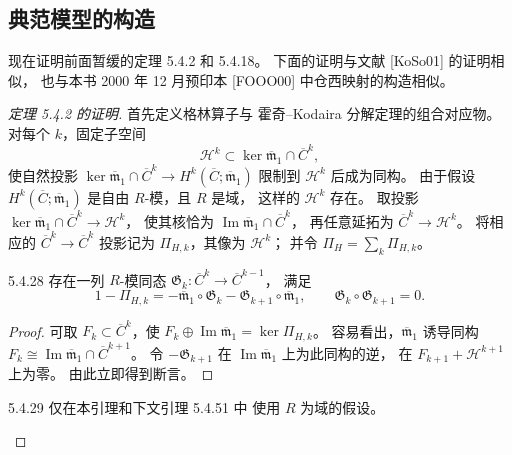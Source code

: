 
\subsection{典范模型的构造}
\label{subsec:5-4-4}

现在证明前面暂缓的定理 5.4.2 和 5.4.18。
下面的证明与文献 [KoSo01] 的证明相似，
也与本书 2000 年 12 月预印本 [FOOO00]
中仓西映射的构造相似。

\begin{proof}[定理 5.4.2 的证明]
首先定义格林算子与
霍奇–Kodaira 分解定理的组合对应物。
对每个 $k$，固定子空间
\[
\mathcal H^k\subset
\ker\overline{\mathfrak m}_1\cap\overline C^k,
\]
使自然投影
$\ker\overline{\mathfrak m}_1\cap\overline C^k
\to H^k(\overline C;\overline{\mathfrak m}_1)$
限制到 $\mathcal H^k$ 后成为同构。
由于假设
$H^k(\overline C;\overline{\mathfrak m}_1)$
是自由 $R$-模，且 $R$ 是域，
这样的 $\mathcal H^k$ 存在。
取投影
$\ker\overline{\mathfrak m}_1\cap\overline C^k
\to\mathcal H^k$，
使其核恰为
$\operatorname{Im}\overline{\mathfrak m}_1
\cap\overline C^k$，
再任意延拓为
$\overline C^k\to\mathcal H^k$。
将相应的
$\overline C^k\to\overline C^k$ 投影记为
$\Pi_{H,k}$，其像为 $\mathcal H^k$；
并令 $\Pi_H=\sum_k\Pi_{H,k}$。

\begin{lemma}{5.4.28}\label{lem:5-4-28}
存在一列 $R$-模同态
$\mathfrak G_k\colon
\overline C^k\to\overline C^{k-1}$，
满足
\[
1-\Pi_{H,k}
=-\overline{\mathfrak m}_1\circ\mathfrak G_k
-\mathfrak G_{k+1}\circ\overline{\mathfrak m}_1,
\qquad
\mathfrak G_k\circ\mathfrak G_{k+1}=0.
\]
\end{lemma}
\begin{proof}
可取 $F_k\subset\overline C^k$，使
$F_k\oplus\operatorname{Im}\overline{\mathfrak m}_1
=\ker\Pi_{H,k}$。
容易看出，$\overline{\mathfrak m}_1$
诱导同构
$F_k\cong\operatorname{Im}\overline{\mathfrak m}_1
\cap\overline C^{k+1}$。
令 $-\mathfrak G_{k+1}$ 在
$\operatorname{Im}\overline{\mathfrak m}_1$
上为此同构的逆，
在 $F_{k+1}+\mathcal H^{k+1}$ 上为零。
由此立即得到断言。
\end{proof}

\begin{remark}{5.4.29}\label{rem:5-4-29}
仅在本引理和下文引理 5.4.51 中
使用 $R$ 为域的假设。
\end{remark}


\end{proof}
